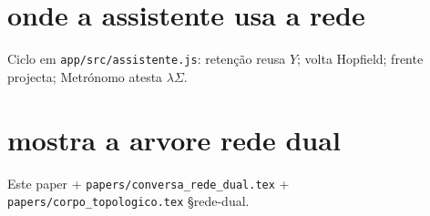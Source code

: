 \documentclass[11pt,a4paper]{article}
\newcommand{\code}[1]{\texttt{\small #1}}
\begin{document}
\section{onde a assistente usa a rede}
Ciclo em \code{app/src/assistente.js}: retenção reusa $Y$; volta Hopfield;
frente projecta; Metrónomo atesta $\lambda\Sigma$.

\section{mostra a arvore rede dual}
Este paper + \code{papers/conversa\_rede\_dual.tex} + \code{papers/corpo\_topologico.tex} \S rede-dual.
\end{document}
